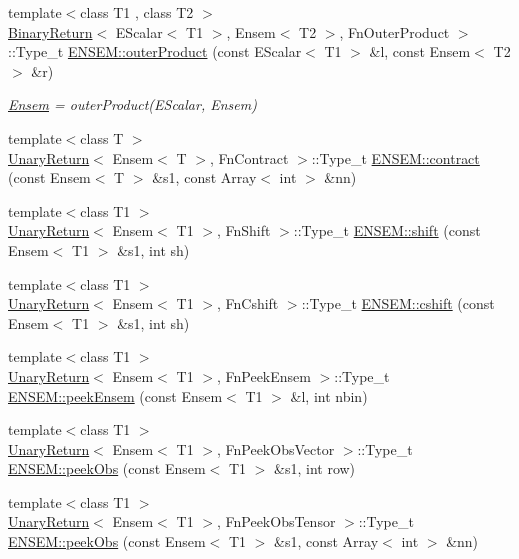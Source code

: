 \begin{DoxyCompactItemize}
{\footnotesize template$<$class T1 , class T2 $>$ }\\\mbox{\hyperlink{structBinaryReturn}{Binary\+Return}}$<$ E\+Scalar$<$ T1 $>$, Ensem$<$ T2 $>$, Fn\+Outer\+Product $>$\+::Type\+\_\+t \mbox{\hyperlink{group__eensem_ga63f92da09e74b21cf1e10e19dbbc9437}{E\+N\+S\+E\+M\+::outer\+Product}} (const E\+Scalar$<$ T1 $>$ \&l, const Ensem$<$ T2 $>$ \&r)
\begin{DoxyCompactList}\small\item\em \mbox{\hyperlink{classENSEM_1_1Ensem}{Ensem}} = outer\+Product(\+E\+Scalar, Ensem) \end{DoxyCompactList}\item 
{\footnotesize template$<$class T $>$ }\\\mbox{\hyperlink{structUnaryReturn}{Unary\+Return}}$<$ Ensem$<$ T $>$, Fn\+Contract $>$\+::Type\+\_\+t \mbox{\hyperlink{group__eensem_ga1ad11b55c96293cf6f5e776c6c9d0f1b}{E\+N\+S\+E\+M\+::contract}} (const Ensem$<$ T $>$ \&s1, const Array$<$ int $>$ \&nn)
\item 
{\footnotesize template$<$class T1 $>$ }\\\mbox{\hyperlink{structUnaryReturn}{Unary\+Return}}$<$ Ensem$<$ T1 $>$, Fn\+Shift $>$\+::Type\+\_\+t \mbox{\hyperlink{group__eensem_gab3a27539680d018ea7af80f7fe677576}{E\+N\+S\+E\+M\+::shift}} (const Ensem$<$ T1 $>$ \&s1, int sh)
\item 
{\footnotesize template$<$class T1 $>$ }\\\mbox{\hyperlink{structUnaryReturn}{Unary\+Return}}$<$ Ensem$<$ T1 $>$, Fn\+Cshift $>$\+::Type\+\_\+t \mbox{\hyperlink{group__eensem_gaaf138ac5ffa49ae31d5a073a994dc4c3}{E\+N\+S\+E\+M\+::cshift}} (const Ensem$<$ T1 $>$ \&s1, int sh)
\item 
{\footnotesize template$<$class T1 $>$ }\\\mbox{\hyperlink{structUnaryReturn}{Unary\+Return}}$<$ Ensem$<$ T1 $>$, Fn\+Peek\+Ensem $>$\+::Type\+\_\+t \mbox{\hyperlink{group__eensem_gafcbe1a7f74ec79a0842cfa9aa2ee948c}{E\+N\+S\+E\+M\+::peek\+Ensem}} (const Ensem$<$ T1 $>$ \&l, int nbin)
\item 
{\footnotesize template$<$class T1 $>$ }\\\mbox{\hyperlink{structUnaryReturn}{Unary\+Return}}$<$ Ensem$<$ T1 $>$, Fn\+Peek\+Obs\+Vector $>$\+::Type\+\_\+t \mbox{\hyperlink{group__eensem_gab81975329321ddb7926b2822e0c53a8e}{E\+N\+S\+E\+M\+::peek\+Obs}} (const Ensem$<$ T1 $>$ \&s1, int row)
\item 
{\footnotesize template$<$class T1 $>$ }\\\mbox{\hyperlink{structUnaryReturn}{Unary\+Return}}$<$ Ensem$<$ T1 $>$, Fn\+Peek\+Obs\+Tensor $>$\+::Type\+\_\+t \mbox{\hyperlink{group__eensem_gadb8dd6729310042f809bf94db594bc5b}{E\+N\+S\+E\+M\+::peek\+Obs}} (const Ensem$<$ T1 $>$ \&s1, const Array$<$ int $>$ \&nn)

\end{DoxyCompactItemize}
